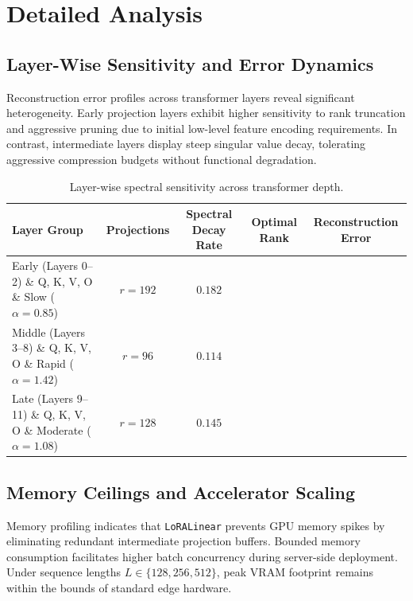 \section{Detailed Analysis}

\subsection{Layer-Wise Sensitivity and Error Dynamics}
Reconstruction error profiles across transformer layers reveal significant heterogeneity. Early projection layers exhibit higher sensitivity to rank truncation and aggressive pruning due to initial low-level feature encoding requirements. In contrast, intermediate layers display steep singular value decay, tolerating aggressive compression budgets without functional degradation.

\begin{table}[H]
\centering
\small
\begin{tabularx}{\linewidth}{lcccc}
\toprule
\textbf{Layer Group} & \textbf{Projections} & \textbf{Spectral Decay Rate} & \textbf{Optimal Rank} & \textbf{Reconstruction Error} \\
\midrule
Early (Layers 0--2) \& Q, K, V, O \& Slow ($\alpha = 0.85$) & $r=192$ & $0.182$ \\
Middle (Layers 3--8) \& Q, K, V, O \& Rapid ($\alpha = 1.42$) & $r=96$ & $0.114$ \\
Late (Layers 9--11) \& Q, K, V, O \& Moderate ($\alpha = 1.08$) & $r=128$ & $0.145$ \\
\bottomrule
\end{tabularx}
\caption{Layer-wise spectral sensitivity across transformer depth.}
\label{tab:layer_sensitivity}
\end{table}

\subsection{Memory Ceilings and Accelerator Scaling}
Memory profiling indicates that \texttt{LoRALinear} prevents GPU memory spikes by eliminating redundant intermediate projection buffers. Bounded memory consumption facilitates higher batch concurrency during server-side deployment. Under sequence lengths $L \in \{128, 256, 512\}$, peak VRAM footprint remains within the bounds of standard edge hardware.

